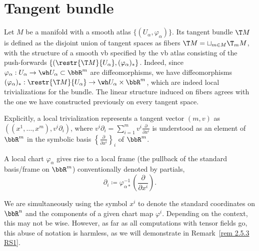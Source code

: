 \section{Tangent bundle}\label{sec tangent bundle}

\begin{defn}
    Let $M$ be a manifold with a smooth atlas $\{(U_\alpha,\varphi_\alpha)\}$. Its tangent bundle $\T M$ is defined as the disjoint union of tangent spaces as fibers $\T M=\sqcup_{m\in M} \T_m M$, with the structure of a smooth \gls{vb} specified by the \gls{vb} atlas consisting of the push-forwards $\{(\restr{\T M}{U_\alpha},(\varphi_\alpha)_\ast\}$. Indeed, since $\varphi_\alpha:U_\alpha\to \wh U_\alpha \subset \bbR^m$ are diffeomorphisms, we have diffeomorphisms $(\varphi_\alpha)_\ast:\restr{\T M}{U_\alpha}\to \wh U_\alpha\times \bbR^m$, which are indeed local trivializations for the bundle. The linear structure induced on fibers agrees with the one we have constructed previously on every tangent space.
\end{defn}

Explicitly, a local trivialization represents a tangent vector $(m,v)$ as $((x^1,\ldots,x^m),v^i\partial_i)$, where $v^i\partial_i=\sum_{i=1}^m v^i\frac{\partial}{\partial x^i}$ is understood as an element of $\bbR^m$ in the symbolic basis $\left\{\frac{\partial}{\partial x^i}\right\}_i$ of $\bbR^m$.

A local chart $\varphi_\alpha$ gives rise to a local frame (the pullback of the standard basis/frame on $\bbR^m$) conventionally denoted by partials, 
\[\boxed{\partial_i\coloneqq \varphi_{\alpha\ast}^{-1}\left(\frac{\partial}{\partial x^i}\right).}\label{eq tangent coordinate frame}\]

\begin{rem}
    We are simultaneously using the symbol $x^i$ to denote the standard coordinates on $\bbR^n$ and the components of a given chart map $\varphi^i$. Depending on the context, this may not be wise. However, as far as all computations with tensor fields go, this abuse of notation is harmless, as we will demonstrate in Remark~\ref{rem 2.5.3 RS1}.
\end{rem}

